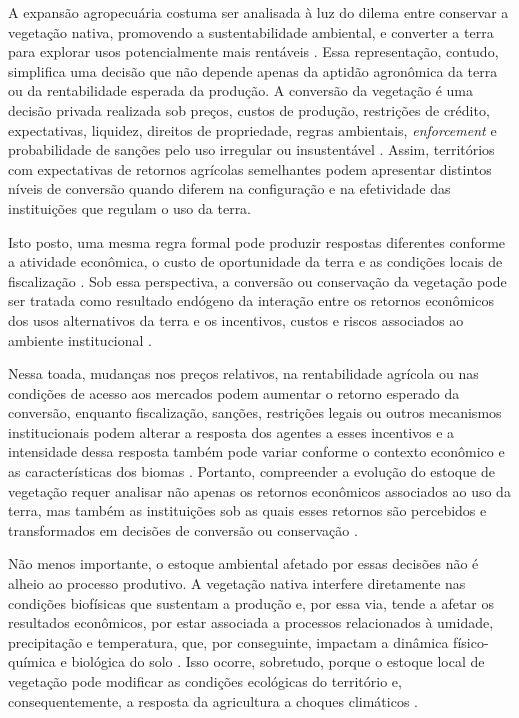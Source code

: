 A expansão agropecuária costuma ser analisada à luz do dilema entre conservar a vegetação nativa, promovendo a sustentabilidade ambiental, e converter a terra para explorar usos potencialmente mais rentáveis \cite{Angelsen2010}. Essa representação, contudo, simplifica uma decisão que não depende apenas da aptidão agronômica da terra ou da rentabilidade esperada da produção. A conversão da vegetação é uma decisão privada realizada sob preços, custos de produção, restrições de crédito, expectativas, liquidez, direitos de propriedade, regras ambientais, \textit{enforcement} e probabilidade de sanções pelo uso irregular ou insustentável \cite{LubowskiEtAl2008,JungEtAl2022}. Assim, territórios com expectativas de retornos agrícolas semelhantes podem apresentar distintos níveis de conversão quando diferem na configuração e na efetividade das instituições que regulam o uso da terra.

\begin{sloppypar}
Isto posto, uma mesma regra formal pode produzir respostas diferentes conforme a atividade econômica, o custo de oportunidade da terra e as condições locais de fiscalização \cite{ViallonEtAl2019,AssuncaoEtAl2023}. Sob essa perspectiva, a conversão ou conservação da vegetação pode ser tratada como resultado endógeno da interação entre os retornos econômicos dos usos alternativos da terra e os incentivos, custos e riscos associados ao ambiente institucional \cite{Braganca2018,PachecoMeyer2022}.
\end{sloppypar}

Nessa toada, mudanças nos preços relativos, na rentabilidade agrícola ou nas condições de acesso aos mercados podem aumentar o retorno esperado da conversão, enquanto fiscalização, sanções, restrições legais ou outros mecanismos institucionais podem alterar a resposta dos agentes a esses incentivos e a intensidade dessa resposta também pode variar conforme o contexto econômico e as características dos biomas \cite{HardingEtAl2021,ChomitzThomas2003}. Portanto, compreender a evolução do estoque de vegetação requer analisar não apenas os retornos econômicos associados ao uso da terra, mas também as instituições sob as quais esses retornos são percebidos e transformados em decisões de conversão ou conservação \cite{Angelsen2010,AnderssonEtAl2014}.

Não menos importante, o estoque ambiental afetado por essas decisões não é alheio ao processo produtivo. A vegetação nativa interfere diretamente nas condições biofísicas que sustentam a produção e, por essa via, tende a afetar os resultados econômicos, por estar associada a processos relacionados à umidade, precipitação e temperatura, que, por conseguinte, impactam a dinâmica físico-química e biológica do solo \cite{SpracklenEtAl2012,JoshiGarkoti2023}. Isso ocorre, sobretudo, porque o estoque local de vegetação pode modificar as condições ecológicas do território e, consequentemente, a resposta da agricultura a choques climáticos \cite{RedheadEtAl2020}.

